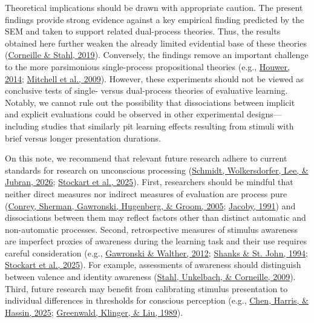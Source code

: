 \documentclass[
  man,floatsintext]{apa6}
\begin{document}
Theoretical implications should be drawn with appropriate caution.
The present findings provide strong evidence against a key empirical finding predicted by the SEM and taken to support related dual-process theories.
Thus, the results obtained here further weaken the already limited evidential base of these theories (\protect\hyperlink{ref-corneilleAssociativeAttitudeLearning2018a}{Corneille \& Stahl, 2019}).
Conversely, the findings remove an important challenge to the more parsimonious single-process propositional theories (e.g., \protect\hyperlink{ref-Houwer2014}{Houwer, 2014}; \protect\hyperlink{ref-mitchellPropositionalNatureHuman2009}{Mitchell et al., 2009}).
However, these experiments should not be viewed as conclusive tests of single- versus dual-process theories of evaluative learning.
Notably, we cannot rule out the possibility that dissociations between implicit and explicit evaluations could be observed in other experimental designs---including studies that similarly pit learning effects resulting from stimuli with brief versus longer presentation durations.

On this note, we recommend that relevant future research adhere to current standards for research on unconscious processing (\protect\hyperlink{ref-Schmidt2026}{Schmidt, Wolkersdorfer, Lee, \& Jubran, 2026}; \protect\hyperlink{ref-Stockart2025}{Stockart et al., 2025}).
First, researchers should be mindful that neither direct measures nor indirect measures of evaluation are process pure (\protect\hyperlink{ref-Conrey2005}{Conrey, Sherman, Gawronski, Hugenberg, \& Groom, 2005}; \protect\hyperlink{ref-Jacoby1991}{Jacoby, 1991}) and dissociations between them may reflect factors other than distinct automatic and non-automatic processes.
Second, retrospective measures of stimulus awareness are imperfect proxies of awareness during the learning task and their use requires careful consideration (e.g., \protect\hyperlink{ref-Gawronski2012}{Gawronski \& Walther, 2012}; \protect\hyperlink{ref-Shanks1994}{Shanks \& St. John, 1994}; \protect\hyperlink{ref-Stockart2025}{Stockart et al., 2025}).
For example, assessments of awareness should distinguish between valence and identity awareness (\protect\hyperlink{ref-Stahl2009}{Stahl, Unkelbach, \& Corneille, 2009}).
Third, future research may benefit from calibrating stimulus presentation to individual differences in thresholds for conscious perception (e.g., \protect\hyperlink{ref-Chen2025}{Chen, Harris, \& Hassin, 2025}; \protect\hyperlink{ref-Greenwald1989}{Greenwald, Klinger, \& Liu, 1989}).
\end{document}
